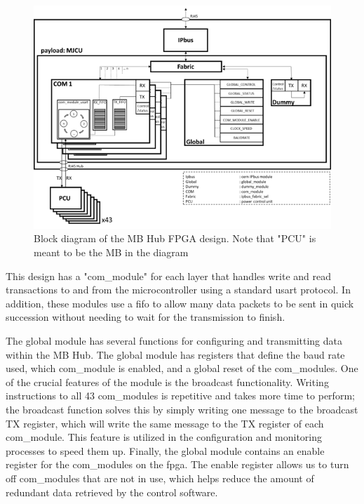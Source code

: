 \documentclass[main.tex]{subfiles}
\begin{document}
\begin{figure}[!htpb]
    \centering
    \includegraphics[width=13cm, scale=1]{images/BlockDiagramFPGA.png}
    \caption{Block diagram of the MB Hub FPGA design. Note that "PCU" is meant to be the MB in the diagram\cite{gutta}}
    \label{fig: fpga_block}
\end{figure}
\FloatBarrier

This design has a "com\_module" for each layer that handles write and read transactions to and from the microcontroller using a standard \gls{usart} protocol. In addition, these modules use a \gls{fifo} to allow many data packets to be sent in quick succession without needing to wait for the transmission to finish.

The global module has several functions for configuring and transmitting data within the MB Hub. The global module has registers that define the baud rate used, which com\_module is enabled, and a global reset of the com\_modules. One of the crucial features of the module is the broadcast functionality. Writing instructions to all 43 com\_modules is repetitive and takes more time to perform; the broadcast function solves this by simply writing one message to the broadcast TX register, which will write the same message to the TX register of each com\_module. This feature is utilized in the configuration and monitoring processes to speed them up. Finally, the global module contains an enable register for the com\_modules on the \gls{fpga}. The enable register allows us to turn off com\_modules that are not in use, which helps reduce the amount of redundant data retrieved by the control software.
\end{document}
